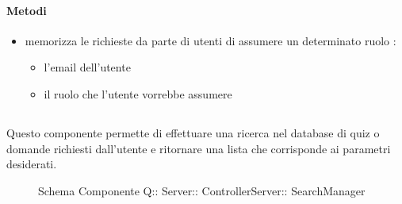 \paragraph{Metodi}
\begin{itemize}
\item {}
\newline
memorizza le richieste da parte di utenti di assumere un determinato ruolo
\newline
{} :
\begin{itemize}
\item {}
\newline
l'email dell'utente
\item {}
\newline
il ruolo che l'utente vorrebbe assumere
\end{itemize}
\end{itemize}
\subsection{}
Questo componente permette di effettuare una ricerca nel database di quiz o domande richiesti dall'utente e ritornare una lista che corrisponde ai parametri desiderati.
\begin{figure}[H]
\centering
\noindent{}
\caption[Schema Componente Quizzipedia::Server::ControllerServer::SearchManager]{Schema Componente Q:: Server:: ControllerServer:: SearchManager}
\end{figure}
